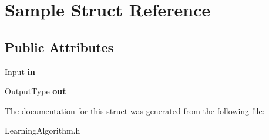 \hypertarget{structSample}{
\section{Sample Struct Reference}
\label{structSample}
}
\subsection*{Public Attributes}
\begin{DoxyCompactItemize}
\item 
\hypertarget{structSample_a21e396853d144d418b0bdd2ecf4d7d6f}{
Input {\bfseries in}}
\label{structSample_a21e396853d144d418b0bdd2ecf4d7d6f}

\item 
\hypertarget{structSample_afc10a872554ab7d7e3ad652c00e5b1a3}{
OutputType {\bfseries out}}
\label{structSample_afc10a872554ab7d7e3ad652c00e5b1a3}

\end{DoxyCompactItemize}


The documentation for this struct was generated from the following file:\begin{DoxyCompactItemize}
\item 
LearningAlgorithm.h\end{DoxyCompactItemize}
